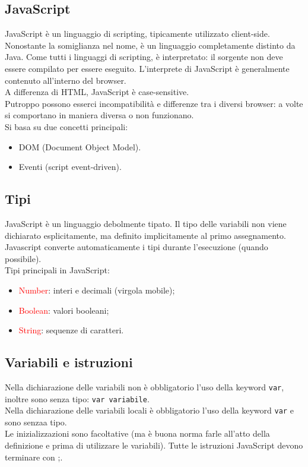 \documentclass{article}
\begin{document}
\subsection{JavaScript}
JavaScript è un linguaggio di scripting, tipicamente utilizzato client-side. Nonostante la somiglianza nel nome, è un linguaggio completamente distinto da Java. Come tutti i linguaggi di scripting, è interpretato: il sorgente non deve essere compilato per essere eseguito.
L'interprete di JavaScript è generalmente contenuto all'interno del browser.
\\A differenza di HTML, JavaScript è case-sensitive.
\\Putroppo possono esserci incompatibilità e differenze tra i diversi browser: a volte si comportano in maniera diversa o non funzionano.
\\ Si basa su due concetti principali:
\begin{itemize}
    \item DOM (Document Object Model).
    \item Eventi (script event-driven).
\end{itemize}
\subsection{Tipi}
JavaScript è un linguaggio debolmente tipato. Il tipo delle variabili non viene dichiarato esplicitamente, ma definito implicitamente al primo assegnamento. Javascript converte automaticamente i tipi durante l'esecuzione (quando possibile).
\\ Tipi principali in JavaScript:
\begin{itemize}
    \item \textcolor{red}{Number}: interi e decimali (virgola mobile);
    \item \textcolor{red}{Boolean}: valori booleani;
    \item \textcolor{red}{String}: sequenze di caratteri.
\end{itemize}
\subsection{Variabili e istruzioni}
Nella dichiarazione delle variabili non è obbligatorio l'uso della keyword \texttt{var}, inoltre sono senza tipo: \texttt{var variabile}.
\\ Nella dichiarazione delle variabili locali è obbligatorio l'uso della keyword \texttt{var} e sono senzaa tipo.
\\ Le inizializzazioni sono facoltative (ma è buona norma farle all'atto della definizione e prima di utilizzare le variabili). Tutte le istruzioni JavaScript devono terminare con ;.
\end{document}
